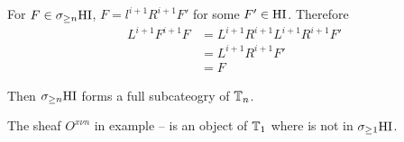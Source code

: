 \begin{ex}
For $F \in \sigma_{\geq n} \mathrm{HI}$, $F=l^{i+1}R^{i+1}F'$ for some $F' \in \mathrm{HI}$.
Therefore 
\begin{align*}
L^{i+1}F^{i+1}F &= L^{i+1}R^{i+1}L^{i+1}R^{i+1}F' \\
&= L^{i+1}R^{i+1}F' \\
&= F
\end{align*}

Then $\sigma_{\geq n} \mathrm{HI}$ forms a full subcateogry of $\mathbb{T}_n$.
\end{ex}

\begin{ex}
The sheaf $O^{x\nu n}$ in example -- is an object of $\mathbb{T}_1$
where is not in $\sigma_{\geq 1} \mathrm{HI}$.
\end{ex}
